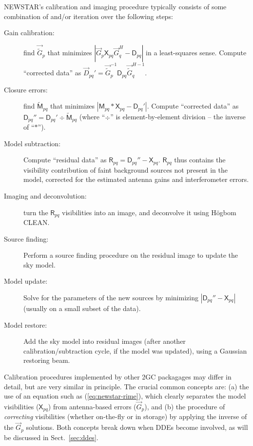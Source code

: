 \documentclass[referee]{aa}
\newcommand{\herm}{H}
\newcommand{\jones}[2]{\vec {#1}_{#2}}
\newcommand{\jonesinv}[2]{\vec {#1}^{-1}_{#2}}
\newcommand{\jonesT}[2]{\vec {#1}^{\herm}_{#2}}
\newcommand{\jonesTinv}[2]{\vec {#1}^{{\herm}-1}_{#2}}
\newcommand{\coh}[2]{\mathsf{{#1}}_{{#2}}}
\begin{document}
NEWSTAR's calibration and imaging procedure typically consists of some combination of and/or iteration over the following steps:

\begin{description}

\item[Gain calibration:] find $\jones{\tilde{G}}{p}$ that minimizes $|\jones{G}{p}\coh{X}{pq}\jonesT{G}{q} - \coh{D}{pq}|$ in a least-squares sense. Compute ``corrected data'' as $\jones{D}{pq}' = \jonesinv{\tilde{G}}{p} \coh{D}{pq} \jonesTinv{\tilde{G}}{q}.$

\item[Closure errors:] find $\coh{\tilde{M}}{pq}$ that minimizes $|\coh{M}{pq} \ast \coh{X}{pq} - \coh{D}{pq}'|$.
Compute ``corrected data'' as $\coh{D}{pq}'' = \coh{D}{pq}' \div \coh{\tilde{M}}{pq}$ (where ``$\div$'' is element-by-element division -- the inverse of ``$\ast$'').

\item[Model subtraction:] Compute ``residual data'' as $\coh{R}{pq} = \coh{D}{pq}'' - \coh{X}{pq}$. $\coh{R}{pq}$ thus contains the visibility contribution of faint background sources not present in the model, corrected for the estimated antenna gains and interferometer errors.

\item[Imaging and deconvolution:] turn the $\coh{R}{pq}$ visibilities into an image, and deconvolve it using H\"ogbom CLEAN. 

\item[Source finding:] Perform a source finding procedure on the residual image to update the sky model.

\item[Model update:] Solve for the parameters of the new sources by minimizing $|\coh{D}{pq}'' - \coh{X}{pq}|$ (usually on a small subset of the data).

\item[Model restore:] Add the sky model into residual images (after another calibration/subtraction cycle, if the model was updated), using a Gaussian restoring beam.

\end{description}

Calibration procedures implemented by other 2GC packagages may differ in detail, but are very similar in principle. The crucial common concepts are: (a) the use of an equation such as (\ref{eq:newstar-rime}), which clearly separates the model visibilities ($\coh{X}{pq}$) from antenna-based errors ($\jones{G}{p}$), and (b) the procedure of \emph{correcting} visibilities (whether on-the-fly or in storage) by applying the inverse of the $\jones{G}{p}$ solutions. Both concepts break down when DDEs become involved, as will be discussed in Sect.~\ref{sec:ddes}.
\end{document}
